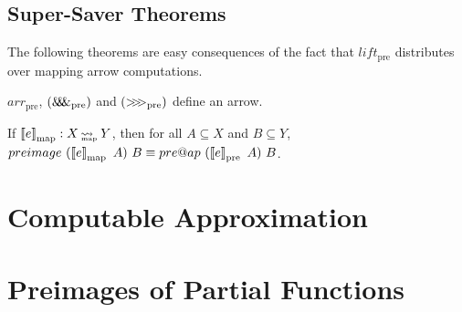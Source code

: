 \documentclass[preprint]{sigplanconf}
\newcommand{\arrow}{\rightsquigarrow}
\newcommand{\arrowlift}{\ensuremath{lift}}
\newcommand{\arrowarr}{\ensuremath{arr}}
\newcommand{\arrowcomp}{\ensuremath{{>}\mspace{-6mu}{>}\mspace{-6mu}{>}}}
\newcommand{\arrowpair}{\ensuremath{\mathit{\&\mspace{-7.5mu}\&\mspace{-7.5mu}\&}}}
\newcommand{\map}{_\mathrm{map}}
\DeclareMathOperator{\mapto}{\arrow_{\mspace{-21mu}\map}}
\newcommand{\pre}{_\mathrm{pre}}
\DeclareMathOperator{\preto}{\arrow_{\mspace{-19mu}\pre}}
\newcommand{\liftpre}{\arrowlift\pre}
\newcommand{\arrpre}{\arrowarr\pre}
\newcommand{\comppre}{\arrowcomp\pre}
\newcommand{\pairpre}{\arrowpair\pre}
\begin{document}
\subsection{Super-Saver Theorems}

The following theorems are easy consequences of the fact that $\liftpre$ distributes over mapping arrow computations.

\begin{corollary}
$\arrpre$, $(\pairpre)$ and $(\comppre)$ define an arrow.
\end{corollary}

\begin{comment}
\begin{corollary}
Let $g : X \mapto Y$ and $h : X \preto Y$ its corresponding preimage arrow computation.
For all $A \subseteq X$ and $B \subseteq Y$, $pre@ap~(h~A)~B \equiv preimage~(g~A)~B$.
\end{corollary}
\end{comment}

\begin{corollary}
If $\meaningof{e}\map : X \mapto Y$, then for all $A \subseteq X$ and $B \subseteq Y$, $preimage~(\meaningof{e}\map~A)~B \equiv pre@ap~(\meaningof{e}\pre~A)~B$.
\end{corollary}

\section{Computable Approximation}


\section{Preimages of Partial Functions}







\end{document}
